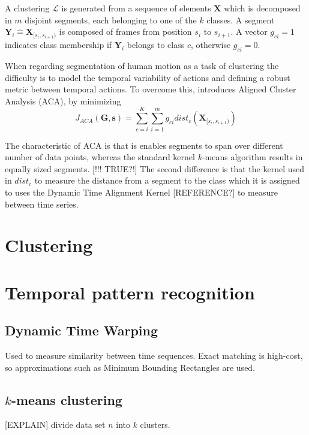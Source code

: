 A clustering $\mathcal{L}$ is generated from a sequence of elements 
$\mathbf{X}$ which is decomposed in $m$ disjoint segments, each belonging to 
one of the $k$ classes. A segment $\mathbf{Y}_i \hat{=} 
\mathbf{X}_{[s_i,s_{i+1})}$ is composed of frames from position $s_i$ to 
$s_{i+1}$. A vector $g_{ci} = 1$ indicates class membership if $\mathbf{Y}_i$ 
belongs to class $c$, otherwise $g_{ci} = 0$.

When regarding segmentation of human motion as a task of clustering the 
difficulty is to model the temporal variability of actions 
and defining a robust metric between temporal actions. To overcome this, 
\cite{zhou2008aligned} introduces Aligned Cluster Analysis (ACA), by minimizing
\begin{equation} \label{eq:ACA}
J_{\mathit{ACA}}(\mathbf{G},\mathbf{s}) = 
\sum_{c=i}^{K} \sum_{i=1}^{m} g_{ci} \mathit{dist}_c 
(\mathbf{X}_{[s_i,s_{i+1})})
\end{equation}

The characteristic of ACA is that is enables segments to span over different 
number of data points, whereas the standard kernel $k$-means algorithm results 
in equally sized segments. [!!! TRUE?!] The second difference is that the 
kernel used in $\mathit{dist}_c$ to measure the distance from a segment to the 
class which it is assigned to uses the Dynamic Time Alignment Kernel 
[REFERENCE?] to measure between time series.

\section{Clustering}

\section{Temporal pattern recognition}

\subsection{Dynamic Time Warping}
Used to measure similarity between time sequences. Exact matching is 
high-cost, so approximations such as Minimum Bounding Rectangles are used.

\subsection{$k$-means clustering}
[EXPLAIN] divide data set $n$ into $k$ clusters.

